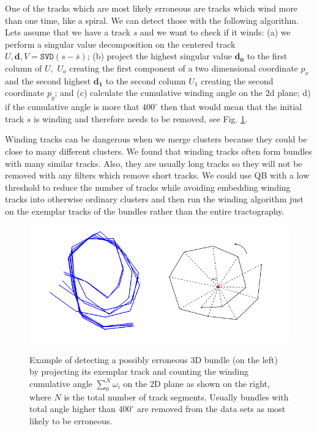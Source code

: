 \documentclass[preprint,authoryear,a4paper,10pt,onecolumn]{elsarticle}
\begin{document}
One of the tracks which are most likely erroneous are tracks which wind
more than one time, like a spiral. We can detect those with the
following algorithm. Lets assume that we have a track $s$ and we want to
check if it winds: (a) we perform a singular value decomposition on the
centered track $U,\mathbf{d},V=\mathtt{SVD}(s-\bar{s})$; (b) project the
highest singular value $\mathbf{d_{0}}$ to the first column of $U,$
$U_{o}$ creating the first component of a two dimensional coordinate
$p_{x}$ and the second highest $\mathbf{d_{1}}$ to the second column
$U_{1}$ creating the second coordinate $p_{y}$; and (c) calculate the
cumulative winding angle on the 2d plane; d) if the cumulative angle is
more that $400^{\circ}$ then that would mean that the initial track $s$
is winding and therefore needs to be removed, see
Fig. \ref{Flo:winding}.

Winding tracks can be dangerous when we merge clusters because they
could be close to many different clusters. We found that winding tracks
often form bundles with many similar tracks. Also, they are usually long
tracks so they will not be removed with any filters which remove short
tracks. We could use QB with a low threshold to reduce the number of
tracks while avoiding embedding winding tracks into otherwise ordinary
clusters and then run the winding algorithm just on the exemplar tracks
of the bundles rather than the entire tractography.

%
\begin{figure}
\begin{centering}
\label{Flo:winding}\includegraphics[scale=0.5]{last_figures/winding}
\par\end{centering}

\caption{Example of detecting a possibly erroneous 3D bundle (on the
  left) by projecting its exemplar track and counting the winding
  cumulative angle $\sum_{0}^{N}\omega_{i}$ on the 2D plane as shown on
  the right, where $N$ is the total number of track segments. Usually
  bundles with total angle higher than $400^{\circ}$ are removed from
  the data sets as most likely to be erroneous.}

\end{figure}
\end{document}
